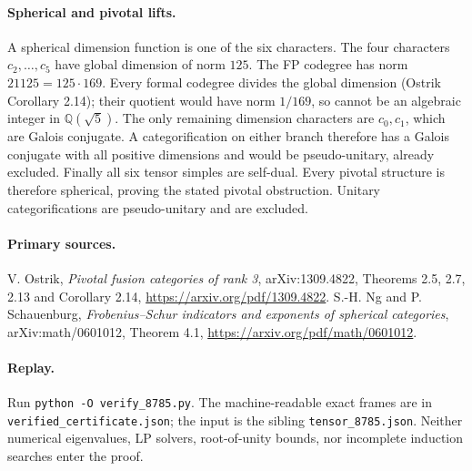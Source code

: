 \documentclass{article}
\begin{document}
\paragraph{Spherical and pivotal lifts.}
A spherical dimension function is one of the six characters. The four
characters $c_2,\ldots,c_5$ have global dimension of norm $125$. The FP
codegree has norm $21125=125\cdot169$. Every formal codegree divides the
global dimension (Ostrik Corollary 2.14); their quotient would have norm
$1/169$, so cannot be an algebraic integer in $\mathbb Q(\sqrt5)$.
The only remaining dimension characters are $c_0,c_1$, which are Galois
conjugate. A categorification on either branch therefore has a Galois
conjugate with all positive dimensions and would be pseudo-unitary,
already excluded. Finally all six tensor simples are self-dual. Every
pivotal structure is therefore spherical, proving the stated pivotal
obstruction. Unitary categorifications are pseudo-unitary and are excluded.

\paragraph{Primary sources.}
V. Ostrik, \emph{Pivotal fusion categories of rank 3}, arXiv:1309.4822,
Theorems 2.5, 2.7, 2.13 and Corollary 2.14,
\url{https://arxiv.org/pdf/1309.4822}.
S.-H. Ng and P. Schauenburg, \emph{Frobenius--Schur indicators and exponents
of spherical categories}, arXiv:math/0601012, Theorem 4.1,
\url{https://arxiv.org/pdf/math/0601012}.

\paragraph{Replay.}
Run \texttt{python -O verify\_8785.py}.
The machine-readable exact frames are in
\texttt{verified\_certificate.json}; the input is the sibling \texttt{tensor\_8785.json}. Neither numerical eigenvalues, LP solvers,
root-of-unity bounds, nor incomplete induction searches enter the proof.
\end{document}
